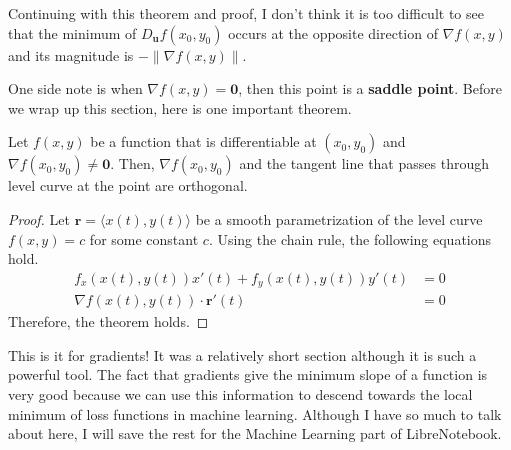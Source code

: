 \documentclass[../../../main.tex]{subfiles}
\begin{document}
Continuing with this theorem and proof, I don't think it is too
difficult to see that the minimum of $D_\mathbf{u} f(x_0, y_0)$ occurs
at the opposite direction of $\nabla f(x, y)$ and its magnitude is
$-\| \nabla f(x, y) \|$.

One side note is when $\nabla f(x, y) = \mathbf{0}$, then this point
is a \textbf{saddle point}. Before we wrap up this section,
here is one important theorem.

\begin{theorem}{}{}
Let $f(x, y)$ be a function that is differentiable at $(x_0, y_0)$ and
$\nabla f(x_0, y_0) \neq \mathbf{0}$. Then, $\nabla f(x_0, y_0)$ and
the tangent line that passes through level curve at the point are
orthogonal.
\end{theorem}
\begin{proof}
Let $\mathbf{r} = \langle x(t), y(t) \rangle$ be a smooth
parametrization of the level curve $f(x, y) = c$ for some constant
$c$. Using the chain rule, the following equations hold.
\begin{align*}
    f_x(x(t), y(t)) x'(t) + f_y(x(t), y(t)) y'(t) &= 0 \\
    \nabla f(x(t), y(t)) \cdot \mathbf{r}'(t) &= 0
\end{align*}
Therefore, the theorem holds.
\end{proof}

This is it for gradients! It was a relatively short section although
it is such a powerful tool. The fact that gradients give the minimum
slope of a function is very good because we can use this information
to descend towards the local minimum of loss functions in machine
learning. Although I have so much to talk about here, I will save the
rest for the Machine Learning part of LibreNotebook.
\end{document}
